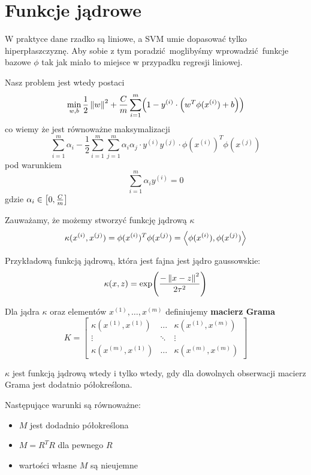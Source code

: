 \section{Funkcje jądrowe}

W praktyce dane rzadko są liniowe, a SVM umie dopasować tylko hiperpłaszczyznę.
Aby sobie z tym poradzić moglibyśmy wprowadzić funkcje bazowe \( \phi \) tak jak miało to miejsce w przypadku regresji liniowej.

Nasz problem jest wtedy postaci
\[
	\min_{w, b} \frac{1}{2} \norm{w}^2 + \frac{C}{m}\sum_{i=1}^m \pars{1 - y^{(i)} \cdot \pars{w^T \phi(x^{(i)}) + b}}
\]
co wiemy że jest równoważne maksymalizacji
\[
	\sum_{i=1}^m \alpha_i - \frac{1}{2} \sum_{i=1}^m \sum_{j=1}^m \alpha_i \alpha_j \cdot y^{(i)}y^{(j)} \cdot \phi(x^{(i)})^T\phi(x^{(j)})
\]
pod warunkiem
\[
	\sum_{i=1}^m \alpha_i y^{(i)} = 0
\]
gdzie \( \alpha_i \in \left[0, \frac{C}{m}\right] \)

Zauważamy, że możemy stworzyć funkcję jądrową \( \kappa \)
\[
	\kappa(x^{(i)}, x^{(j)}) = \phi(x^{(i)})^T\phi(x^{(j)}) = \left\langle \phi(x^{(i)}), \phi(x^{(j)})\right\rangle
\]

Przykładową funkcją jądrową, która jest fajna jest jądro gaussowskie:
\[
	\kappa(x, z) = \exp\pars{\frac{-\norm{x - z}^2}{2\tau^2}}
\]

\begin{definition}
	Dla jądra \( \kappa \) oraz elementów \( x^{(1)}, \dots, x^{(m)} \) definiujemy \textbf{macierz Grama}
	\[
		K = \begin{bmatrix}
			\kappa(x^{(1)}, x^{(1)}) & \hdots & \kappa(x^{(1)}, x^{(m)}) \\
			\vdots                   & \ddots & \vdots                   \\
			\kappa(x^{(m)}, x^{(1)}) & \hdots & \kappa(x^{(m)}, x^{(m)})
		\end{bmatrix}
	\]
\end{definition}

\begin{theorem}[Mercer]
	\( \kappa \) jest funkcją jądrową wtedy i tylko wtedy, gdy dla dowolnych obserwacji macierz Grama jest dodatnio półokreślona.
\end{theorem}
\begin{theorem}
	Następujące warunki są równoważne:
	\begin{itemize}
		\item \( M \) jest dodadnio półokreślona
		\item \( M = R^TR \) dla pewnego \( R \)
		\item wartości własne \( M \) są nieujemne
	\end{itemize}
\end{theorem}

